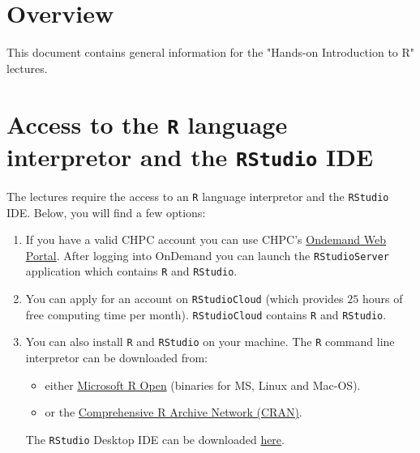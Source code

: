\section*{Overview}

This document contains general information for the "Hands-on Introduction to R" lectures.\newline

\section{Access to the \texttt{R} language interpretor and the \texttt{RStudio} IDE}

The lectures require the access to an \texttt{R} language interpretor and the \texttt{RStudio} IDE.
Below, you will find a few options:

\begin{enumerate}
\item If you have a valid CHPC account you can use CHPC's \href{http://ondemand.chpc.utah.edu/}{Ondemand Web Portal}.\newline
      After logging into OnDemand you can launch the \texttt{RStudioServer} application which contains \texttt{R} and \texttt{RStudio}.

\item You can apply for an account on \texttt{RStudioCloud} (which provides $25$ hours of free computing time per month).\newline
      \texttt{RStudioCloud} contains \texttt{R} and \texttt{RStudio}. 

\item You can also install \texttt{R} and \texttt{RStudio} on your machine.\newline
      The \texttt{R} command line interpretor can be downloaded from:
      \begin{itemize}
	      \item either \href{https://mran.microsoft.com/}{Microsoft R Open} (binaries for MS, Linux and Mac-OS).
  	 \item or the \href{https://cran.r-project.org/}{Comprehensive R Archive Network (CRAN)}.
      \end{itemize}			

      The \texttt{RStudio} Desktop IDE can be downloaded \href{https://www.rstudio.com/products/rstudio/download/}{here}.

\end{enumerate}



